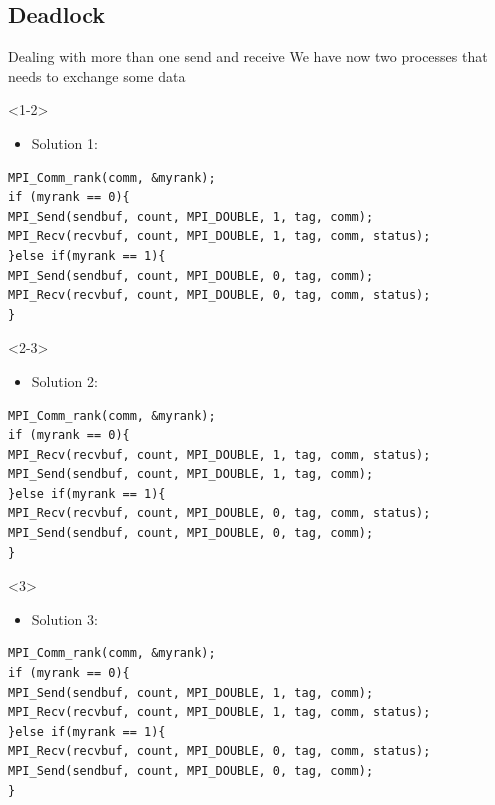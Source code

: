 \documentclass[xcolor={svgnames,usenames}]{beamer}
\begin{document}
\subsection{Deadlock}

\begin{frame}[fragile]{Dealing with more than one send and receive}
We have now two processes that needs to exchange some data

\begin{onlyenv}<1-2>
\begin{itemize}
\item Solution 1:
\end{itemize}
{\footnotesize
\begin{verbatim}
MPI_Comm_rank(comm, &myrank);
if (myrank == 0){
MPI_Send(sendbuf, count, MPI_DOUBLE, 1, tag, comm);
MPI_Recv(recvbuf, count, MPI_DOUBLE, 1, tag, comm, status);
}else if(myrank == 1){
MPI_Send(sendbuf, count, MPI_DOUBLE, 0, tag, comm); 
MPI_Recv(recvbuf, count, MPI_DOUBLE, 0, tag, comm, status);
}
\end{verbatim}
}
\end{onlyenv}

\begin{onlyenv}<2-3>
\begin{itemize}
\item Solution 2:
\end{itemize}
{\footnotesize
\begin{verbatim}
MPI_Comm_rank(comm, &myrank);
if (myrank == 0){
MPI_Recv(recvbuf, count, MPI_DOUBLE, 1, tag, comm, status);
MPI_Send(sendbuf, count, MPI_DOUBLE, 1, tag, comm);
}else if(myrank == 1){ 
MPI_Recv(recvbuf, count, MPI_DOUBLE, 0, tag, comm, status);
MPI_Send(sendbuf, count, MPI_DOUBLE, 0, tag, comm);
}
\end{verbatim}
}
\end{onlyenv}

\begin{onlyenv}<3>
\begin{itemize}
\item Solution 3:
\end{itemize}
{\footnotesize
\begin{verbatim}
MPI_Comm_rank(comm, &myrank);
if (myrank == 0){
MPI_Send(sendbuf, count, MPI_DOUBLE, 1, tag, comm);
MPI_Recv(recvbuf, count, MPI_DOUBLE, 1, tag, comm, status);
}else if(myrank == 1){
MPI_Recv(recvbuf, count, MPI_DOUBLE, 0, tag, comm, status);
MPI_Send(sendbuf, count, MPI_DOUBLE, 0, tag, comm); 
}
\end{verbatim}
}
\end{onlyenv}
\vfill
\end{frame}
\end{document}
